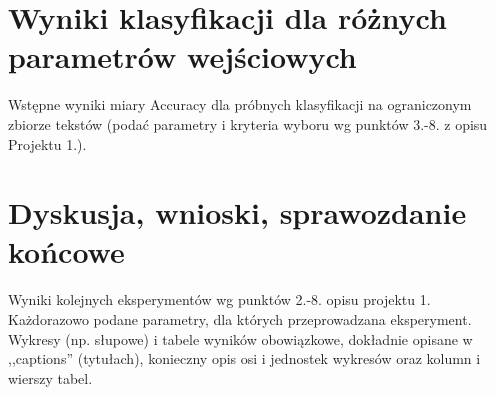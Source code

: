 \documentclass{article}
\begin{document}
\section{Wyniki klasyfikacji dla różnych parametrów wejściowych}
Wstępne wyniki miary Accuracy dla próbnych klasyfikacji na ograniczonym zbiorze tekstów (podać parametry i kryteria
wyboru wg punktów 3.-8. z opisu Projektu 1.). 


\section{Dyskusja, wnioski, sprawozdanie końcowe}

Wyniki kolejnych eksperymentów wg punktów 2.-8. opisu projektu 1.  Każdorazowo
podane parametry, dla których przeprowadzana eksperyment. 
Wykresy (np. słupowe) i tabele wyników
obowiązkowe, dokładnie opisane w ,,captions'' (tytułach), konieczny opis osi i
jednostek wykresów oraz kolumn i wierszy tabel.\\ 
\end{document}
